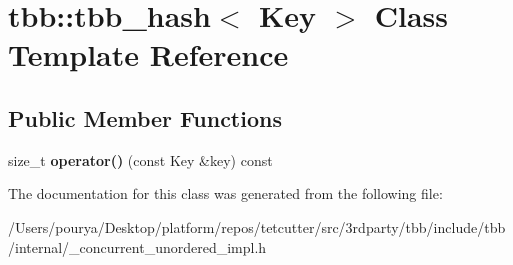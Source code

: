 \hypertarget{classtbb_1_1tbb__hash}{}\section{tbb\+:\+:tbb\+\_\+hash$<$ Key $>$ Class Template Reference}
\label{classtbb_1_1tbb__hash}
\subsection*{Public Member Functions}
\begin{DoxyCompactItemize}
\item 
\hypertarget{classtbb_1_1tbb__hash_a27943662b6c0c55c52bfee2cd10d9490}{}size\+\_\+t {\bfseries operator()} (const Key \&key) const \label{classtbb_1_1tbb__hash_a27943662b6c0c55c52bfee2cd10d9490}

\end{DoxyCompactItemize}


The documentation for this class was generated from the following file\+:\begin{DoxyCompactItemize}
\item 
/\+Users/pourya/\+Desktop/platform/repos/tetcutter/src/3rdparty/tbb/include/tbb/internal/\+\_\+concurrent\+\_\+unordered\+\_\+impl.\+h\end{DoxyCompactItemize}
